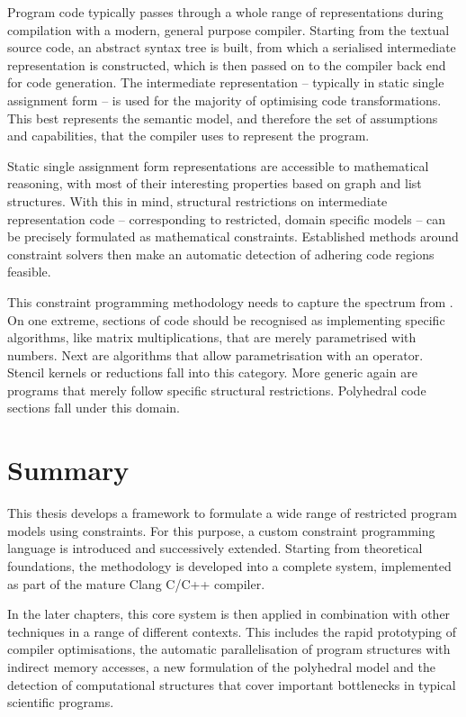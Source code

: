     Program code typically passes through a whole range of representations
    during compilation with a modern, general purpose compiler.
    Starting from the textual source code, an abstract syntax tree is built,
    from which a serialised intermediate representation is constructed,
    which is then passed on to the compiler back end for code generation.
    The intermediate representation -- typically in static single assignment
    form -- is used for the majority of optimising code transformations.
    This best represents the semantic model, and therefore the set of
    assumptions and capabilities, that the compiler uses to represent the
    program.

    Static single assignment form representations are accessible to mathematical
    reasoning, with most of their interesting properties based on graph and list
    structures.
    With this in mind, structural restrictions on intermediate representation
    code -- corresponding to restricted, domain specific models -- can be
    precisely formulated as mathematical constraints.
    Established methods around constraint solvers then make an automatic
    detection of adhering code regions feasible.

    This constraint programming methodology needs to capture the spectrum from
    .
    On one extreme, sections of code should be recognised as implementing
    specific algorithms, like matrix multiplications, that are merely
    parametrised with numbers.
    Next are algorithms that allow parametrisation with an operator.
    Stencil kernels or reductions fall into this category.
    More generic again are programs that merely follow specific structural
    restrictions.
    Polyhedral code sections fall under this domain.

\section{Summary}

    This thesis develops a framework to formulate a wide range of restricted
    program models using constraints.
    For this purpose, a custom constraint programming language is introduced
    and successively extended.
    Starting from theoretical foundations, the methodology is developed into
    a complete system, implemented as part of the mature Clang C/C++ compiler.

    In the later chapters, this core system is then applied in combination
    with other techniques in a range of different contexts.
    This includes the rapid prototyping of compiler optimisations, the
    automatic parallelisation of program structures with indirect memory
    accesses, a new formulation of the polyhedral model and the detection of
    computational structures that cover important bottlenecks in typical
    scientific programs.
    
